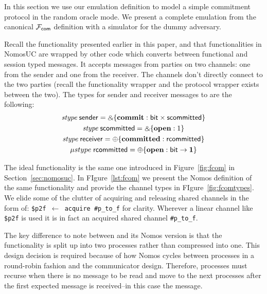 In this section we use our emulation definition to model a simple commitment protocol in the random oracle mode.
We present a complete emulation from the canonical $\mathcal{F}_{{\mathsf {com}}}$ definition with a simulator for the dummy adversary.

Recall the functionality \Fcom presented earlier in this paper, and that functionalities in NomosUC are wrapped by other code which converts between functional and session typed messages. 
It accepts messages from parties on two channels: one from the sender and one from the receiver.
The channels don't directly connect to the two parties (recall the functionality wrapper and the protocol wrapper exists between the two).
The types for sender and receiver messages to \Fcom are the following:
\begin{gather}
\mbox{\it stype} \; \mathsf{sender} = \mathbin{\binampersand} \{ \mathbf{commit} : \mathsf{bit} \times \mathsf{scommitted} \} \\
\mbox{\it stype} \; \mathsf{scommitted} = \mathbin{\binampersand} \{ \mathbf{open} : 1 \} \\
\mbox{\it stype} \; \mathsf{receiver} = \oplus \{ \mathbf{committed} : \mathsf{rcommitted} \} \\
\mu{stype} \; \mathsf{rcommitted} = \oplus \{ \mathbf{open} : \mathsf{bit} \rightarrow \mathbf{1} \}
\end{gather}

The ideal functionality \Fcom is the same one introduced in Figure~\ref{fig:fcom} in Section~\ref{sec:nomosuc}. 
In FIgure~\ref{lst:fcom} we present the Nomos definition of the same functionality and provide the channel types in FIgure~\ref{fig:fcomtypes}.
We elide some of the clutter of acquiring and releasing shared channels in the form of: \texttt{\$p2f $\leftarrow$ acquire \#p\_to\_f} for clarity. 
Wherever a linear channel like \texttt{\$p2f} is used it is in fact an acquired shared channel \texttt{\#p\_to\_f}.

The key difference to note between \Fcom and its Nomos version is that the functionality is split up into two processes rather than compressed into one.
This design decision is required because of how Nomos cycles between processes in a round-robin fashion and the communicator design.
Therefore, processes must recurse when there is no message to be read and move to the next processes after the first expected message is received--in this case the  message.


